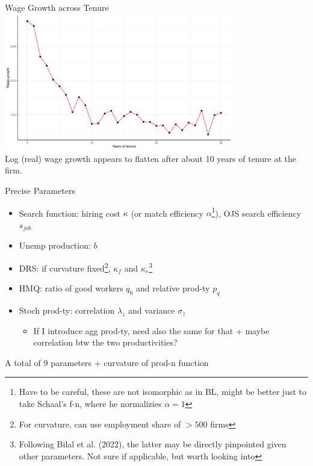 \documentclass[9pt,aspectratio=169]{beamer} %
\begin{document}
\begin{frame}[noframenumbering]{Wage Growth across Tenure}
\hypertarget{Wage growth}{}
\includegraphics[width=0.75\textwidth]{Wage growth across tenure under 30,cutoff 100.jpg} \\
Log (real) wage growth appears to flatten after about 10 years of tenure at the firm.
\hyperlink{Contracting}{}

\end{frame}
\begin{frame}[noframenumbering]{Precise Parameters}
 \hypertarget{Calib}{}
\begin{itemize}
    \item Search function: hiring cost $\kappa$ (or match efficiency $\alpha$\footnote{Have to be careful, these are not isomorphic as in BL, might be better just to take Schaal's f-n, where he normalizies $\alpha=1$}), OJS search efficiency $s_{job}$
    \item Unemp production: $b$
    \item DRS: if curvature fixed\footnote{For curvature, can use employment share of $>500$ firms}, $\kappa_f$ and $\kappa_e$\footnote{Following Bilal et al. (2022), the latter may be directly pinpointed given other parameters. Not sure if applicable, but worth looking into}
    \item HMQ: ratio of good workers $q_0$ and relative prod-ty $p_q$
    \item Stoch prod-ty: correlation $\lambda_z$ and variance $\sigma_z$
    \begin{itemize}
        \item If I introduce agg prod-ty, need also the same for that + maybe correlation btw the two productivities?
    \end{itemize}
\end{itemize}
A total of 9 parameters + curvature of prod-n function
\end{frame}
\end{document}
